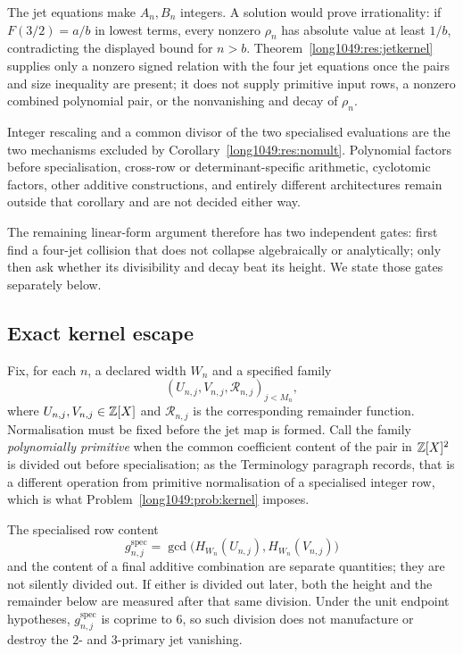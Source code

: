 \documentclass[11pt]{article}
\begin{document}
The jet equations make \(A_n,B_n\) integers.  A solution would prove
irrationality: if \(F(3/2)=a/b\) in lowest terms, every nonzero \(\rho_n\) has
absolute value at least \(1/b\), contradicting the displayed bound for
\(n>b\).  Theorem~\ref{long1049:res:jetkernel} supplies only a nonzero signed relation
with the four jet equations once the pairs and size inequality are present; it
does not supply primitive input rows, a nonzero combined polynomial pair, or
the nonvanishing and decay of \(\rho_n\).

Integer rescaling and a common divisor of the two specialised evaluations are
the two mechanisms excluded by Corollary~\ref{long1049:res:nomult}.  Polynomial factors
before specialisation, cross-row or determinant-specific arithmetic,
cyclotomic factors, other additive constructions, and entirely different
architectures remain outside that corollary and are not decided either way.

The remaining linear-form argument therefore has two
independent gates: first find a four-jet collision that does not collapse
algebraically or analytically; only then ask whether its divisibility and decay
beat its height.  We state those gates separately below.

\subsection{Exact kernel escape}

Fix, for each $n$, a declared width $W_n$ and a specified family
\[
 (U_{n,j},V_{n,j},\mathcal R_{n,j})_{j<M_n},
\]
where $U_{n,j},V_{n,j}\in\mathbb{Z}[X]$ and $\mathcal R_{n,j}$ is the corresponding
remainder function.  Normalisation must be fixed before the jet map is formed.
Call the family \emph{polynomially primitive} when the common coefficient
content of the pair in $\mathbb{Z}[X]^2$ is divided out before specialisation; as the
Terminology paragraph records, that is a different operation from primitive
normalisation of a specialised integer row, which is what
Problem~\ref{long1049:prob:kernel} imposes.

The specialised row content
\[
 g^{\mathrm{spec}}_{n,j}
 =\gcd\!\bigl(H_{W_n}(U_{n,j}),H_{W_n}(V_{n,j})\bigr)
\]
and the content of a final additive combination are separate quantities; they
are not silently divided out.  If either is divided out later, both the height
and the remainder below are measured after that same division.  Under the unit
endpoint hypotheses, $g^{\mathrm{spec}}_{n,j}$ is coprime to $6$, so such
division does not manufacture or destroy the $2$- and $3$-primary jet
vanishing.
\end{document}
